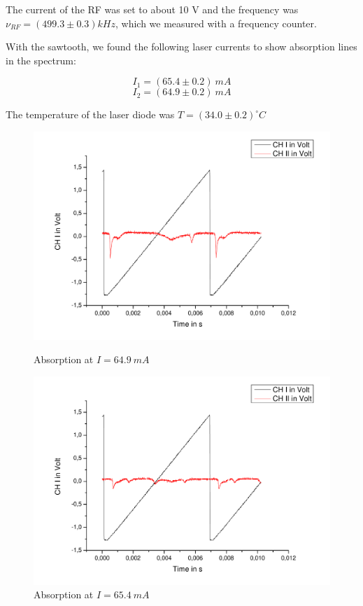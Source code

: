The current of the RF was set to about 10 V and the frequency was $\nu_{RF} = (499.3 \pm 0.3) kHz$, which we measured with a frequency counter.

With the sawtooth, we found the following laser currents to show absorption lines in the spectrum:

$$ I_1 = (65.4 \pm 0.2)\ mA $$
$$ I_2 = (64.9 \pm 0.2 )\ mA $$

The temperature of the laser diode was $T=(34.0 \pm 0.2)^\circ C$
 
\begin{figure}[H] 
\begin{minipage}{0.5\textwidth} 
\centering \includegraphics[width=\textwidth]{BilderAusw/DR_1.pdf}
\caption{Absorption at $I = 64.9\ mA$}
\end{minipage}
\begin{minipage}{0.5\textwidth} 
\centering \includegraphics[width=\textwidth]{BilderAusw/DR_2.pdf}
\caption{Absorption at $I = 65.4\ mA$}
\end{minipage}
\end{figure}

